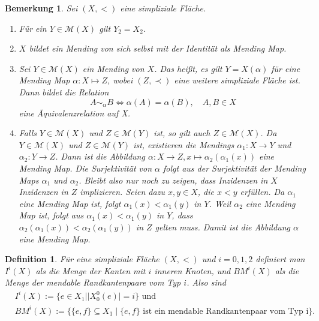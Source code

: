 \documentclass[12pt,titlepage,twoside,cleardoublepage]{article}
\theoremstyle{nummermitklammern}
\newtheorem{definition}[temp]{Definition}
\newtheorem{bemerkung}[temp]{Bemerkung}
\newtheorem{definition}[zahl]{Definition}
\newtheorem{bemerkung}[zahl]{Bemerkung}
\numberwithin{equation}{section}
\begin{document}
  \begin{bemerkung}
  Sei $(X,<)$ eine simpliziale Fläche.
  \begin{enumerate}
  \item Für ein $Y \in \mathcal{M}(X)$ gilt $Y_2=X_2$.
  \item $X$ bildet ein Mending von sich selbst mit der Identität als Mending Map.
  \item Sei $Y\in \mathcal{M}(X)$ ein Mending von $X$. Das heißt, es gilt $Y=X(\alpha)$ für eine Mending Map $\alpha:X \mapsto Z$, wobei $(Z,\prec)$ eine weitere simpliziale Fläche ist. Dann bildet die Relation 
  \[
A\sim_\alpha B \Leftrightarrow \alpha(A)=\alpha(B),\quad A,B \in X
  \]
  eine Äquivalenzrelation auf X.
  \item Falls $Y\in \mathcal{M}(X)$ und $Z \in \mathcal{M}(Y)$ ist, so gilt auch $Z\in \mathcal{M}(X)$.
   Da $Y\in \mathcal{M}(X)$ und $Z\in \mathcal{M}(Y)$ ist, existieren die Mendings $\alpha_1: X \to Y$ und $\alpha_2:Y \to Z$.
    Dann ist die Abbildung $\alpha :X \to Z,x\mapsto \alpha_2(\alpha_1(x))$ eine Mending Map.
     Die Surjektivität von $\alpha$ folgt aus der Surjektivität der Mending Maps $\alpha_1$ und $\alpha_2$.
      Bleibt also nur noch zu zeigen, dass Inzidenzen in $X$ Inzidenzen in $Z$ implizieren. Seien dazu $x,y\in X$, die $x<y$ erfüllen.
       Da $\alpha_1$ eine Mending Map ist, folgt $\alpha_1(x)<\alpha_1(y)$ in $Y$. 
     Weil $\alpha_2$ eine Mending Map ist, folgt aus $\alpha_1(x)<\alpha_1 (y)$ in $Y$, dass $\alpha_2 ( \alpha_1(x))<\alpha_2(\alpha_1(y))$ in $Z$ gelten muss.
      Damit ist die Abbildung $\alpha$ eine Mending Map.
  \end{enumerate}
  \end{bemerkung}
  
  \begin{definition}
  Für eine simpliziale Fläche $(X,<)$ und $i=0,1,2$ definiert man $I^{i}(X)$ als die Menge der Kanten mit $i$ inneren Knoten, und $BM^{i}(X)$ als die Menge der mendable Randkantenpaare vom Typ $i$. Also sind
  \begin{align*}
  &I^i(X):=\{e \in X_1 \mid \vert X_{0}^{0}(e)\vert=i\}\text{ und}\\
  &BM^{i}(X):=\{\{e,f\}\subseteq X_1 \mid \{e,f\}\text{ ist ein mendable Randkantenpaar vom Typ i}\}.\\
  \end{align*}
  \end{definition}
  
  
\end{document}
